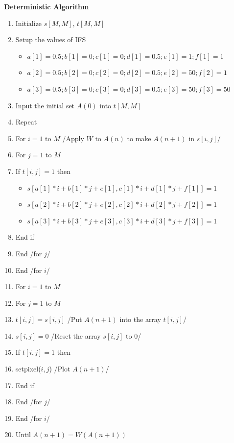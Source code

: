\pagebreak
\textbf{Deterministic Algorithm}
\begin{enumerate}
    \item Initialize $s[M,M]$, $t[M,M]$
    \item Setup the values of IFS
    \begin{itemize}
        \item $a[1]=0.5; b[1]=0; c[1]=0; d[1]=0.5; e[1]=1; f[1]=1$
        \item $a[2]=0.5; b[2]=0; c[2]=0; d[2]=0.5; e[2]=50; f[2]=1$
        \item $a[3]=0.5; b[3]=0; c[3]=0; d[3]=0.5; e[3]=50; f[3]=50$
    \end{itemize}
    \item Input the initial set $A(0)$ into $t[M,M]$
    \item Repeat
    \item For $i=1$ to $M$ /Apply $W$ to $A(n)$ to make $A(n+1)$ in $s[i,j]$/
    \item \quad For $j=1$ to $M$
    \item \quad \quad If $t[i,j]=1$ then
    \begin{itemize}
        \item $s[a[1]*i+b[1]*j+e[1], c[1]*i+d[1]*j+f[1]]=1$
        \item $s[a[2]*i+b[2]*j+e[2], c[2]*i+d[2]*j+f[2]]=1$
        \item $s[a[3]*i+b[3]*j+e[3], c[3]*i+d[3]*j+f[3]]=1$
    \end{itemize}
    \item \quad \quad End if
    \item \quad End /for $j$/
    \item End /for $i$/
    \item For $i=1$ to $M$
    \item \quad For $j=1$ to $M$
    \item \quad \quad $t[i,j]=s[i,j]$ /Put $A(n+1)$ into the array $t[i,j]$/
    \item \quad \quad $s[i,j] =0$ /Reset the array $s[i,j]$ to 0/
    \item \quad \quad If $t[i,j]=1$ then
    \item \quad \quad \quad setpixel($i,j$) /Plot $A(n+1)$/
    \item \quad \quad End if
    \item \quad \quad End /for $j$/
    \item End /for $i$/
    \item Until $A(n+1)=W(A(n+1))$
\end{enumerate}

